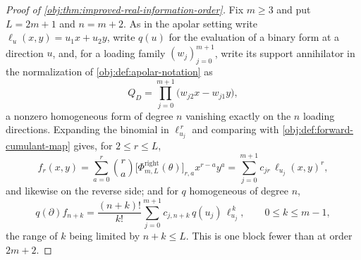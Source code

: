 \documentclass[11pt]{article}
\begin{document}
\begin{proof}[Proof of \cref{obj:thm:improved-real-information-order}]
Fix \(m\ge 3\) and put \(L=2m+1\) and \(n=m+2\).  As in the apolar setting write \(\ell_u(x,y)=u_1x+u_2y\), write \(q(u)\) for the evaluation of a binary form at a direction \(u\), and, for a loading family \((w_j)_{j=0}^{m+1}\), write its support annihilator in the normalization of \cref{obj:def:apolar-notation} as
\[
Q_D=\prod_{j=0}^{m+1}\bigl(w_{j2}x-w_{j1}y\bigr),
\]
a nonzero homogeneous form of degree \(n\) vanishing exactly on the \(n\) loading directions.  Expanding the binomial in \(\ell_{u_j}^{\,r}\) and comparing with \cref{obj:def:forward-cumulant-map} gives, for \(2\le r\le L\),
\[
f_r(x,y)=\sum_{a=0}^{r}\binom{r}{a}\bigl[\Phi^{\mathrm{right}}_{m,L}(\theta)\bigr]_{r,a}x^{r-a}y^{a}
=\sum_{j=0}^{m+1}c_{jr}\,\ell_{u_j}(x,y)^{r},
\]
and likewise on the reverse side; and for \(q\) homogeneous of degree \(n\),
\[
q(\partial)f_{n+k}=\frac{(n+k)!}{k!}\sum_{j=0}^{m+1}c_{j,n+k}\,q(u_j)\,\ell_{u_j}^{\,k},
\qquad 0\le k\le m-1 ,
\]
the range of \(k\) being limited by \(n+k\le L\).  This is one block fewer than at order \(2m+2\).


\end{proof}
\end{document}
